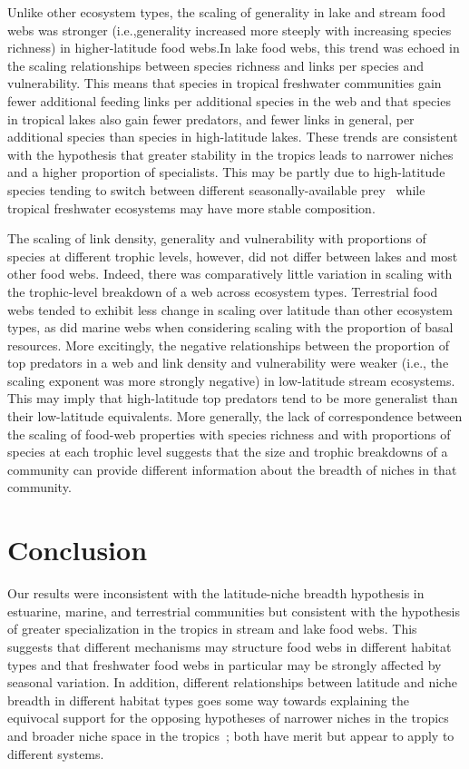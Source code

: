 \documentclass[12pt]{article}
\begin{document}
\begin{spacing}{1.0}
  Unlike other ecosystem types, the scaling of generality in lake and stream
  food webs was stronger (i.e.,generality increased more steeply with
  increasing species richness) in higher-latitude food webs.In lake food webs,
  this trend was echoed in the scaling relationships between species richness
  and links per species and vulnerability. This means that species in tropical
  freshwater communities gain fewer additional feeding links per additional
  species in the web and that species in tropical lakes also gain fewer
  predators, and fewer links in general, per additional species than species
  in high-latitude lakes. These trends are consistent with the hypothesis that
  greater stability in the tropics leads to narrower
  niches~\citep{Vazquez2004} and a higher proportion of specialists. This may
  be partly due to high-latitude species tending to switch between different
  seasonally-available prey~\citep{Isaac2012,Wilhelm1999} while tropical
  freshwater ecosystems may have more stable composition.


  The scaling of link density, generality and vulnerability with proportions
  of species at different trophic levels, however, did not differ between lakes
  and most other food webs. Indeed, there was comparatively little variation in
  scaling with the trophic-level breakdown of a web across ecosystem types.
  Terrestrial food webs tended to exhibit less change in scaling over latitude
  than other ecosystem types, as did marine webs when considering scaling with
  the proportion of basal resources. More excitingly, the negative relationships
  between the proportion of top predators in a web and link density and
  vulnerability were weaker (i.e., the scaling exponent was more strongly
  negative) in low-latitude stream ecosystems. This may imply that high-latitude
  top predators tend to be more generalist than their low-latitude equivalents.
  More generally, the lack of correspondence between the scaling of food-web
  properties with species richness and with proportions of species at each
  trophic level suggests that the size and trophic breakdowns of a community can
  provide different information about the breadth of niches in that community.

\section*{Conclusion}

  Our results were inconsistent with the latitude-niche breadth hypothesis in estuarine, marine,
  and terrestrial communities but consistent with the hypothesis of greater specialization
  in the tropics in stream and lake food webs. This suggests that different mechanisms may structure
  food webs in different habitat types and that freshwater food webs in particular may be strongly
  affected by seasonal variation. In addition, different relationships between latitude and niche
  breadth in different habitat types goes some way towards explaining the equivocal support for
  the opposing hypotheses of narrower niches in the tropics~\citep{Vazquez2004} and broader 
  niche space in the tropics~\citep{Davies2007}; both have merit but appear
  to apply to different systems.



\end{spacing}
\end{document}
